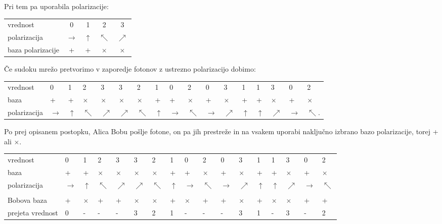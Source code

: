 \documentclass[A4paper, 11pt]{article}
\begin{document}
Pri tem pa uporabila polarizacije:

\begin{center}
\begin{tabular}{l c c c c}
vrednost & 0 & 1 & 2 & 3\\
polarizacija & $\rightarrow$ & $\uparrow$ & $\nwarrow$ & $\nearrow$\\
baza polarizacije & + & + & $\times$ & $\times$\\
\end{tabular}
\end{center}

Če sudoku mrežo pretvorimo v zaporedje fotonov z ustrezno polarizacijo dobimo:

\begin{center}
\begin{tabular}{l m{0.2 cm} m{0.2 cm} m{0.2 cm} m{0.2 cm} m{0.2 cm} m{0.2 cm} m{0.2 cm} m{0.2 cm} m{0.2 cm} m{0.2 cm} m{0.2 cm} m{0.2 cm} m{0.2 cm} m{0.2 cm} m{0.2 cm} m{0.2 cm}}
vrednost & 0 & 1 & 2 & 3 & 3 & 2 & 1 & 0 & 2 & 0 & 3 & 1 & 1 & 3 & 0 & 2\\
baza & + & + & $\times$ & $\times$ & $\times$ & $\times$ & + & + & $\times$ & + & $\times$ & + & + & $\times$ & + & $\times$\\
polarizacija & $\rightarrow$ & $\uparrow$ & $\nwarrow$ & $\nearrow$ & $\nearrow$ & $\nwarrow$ & $\uparrow$ & $\rightarrow$ & $\nwarrow$ & $\rightarrow$ & $\nearrow$ & $\uparrow$ & $\uparrow$ & $\nearrow$ & $\rightarrow$ & $\nwarrow$.
\end{tabular}
\end{center}

Po prej opisanem postopku, Alica Bobu pošlje fotone, on pa jih prestreže in na vsakem uporabi naključno izbrano bazo polarizacije, torej + ali $\times$. 

\begin{center}
\begin{tabular}{l m{0.2 cm} m{0.2 cm} m{0.2 cm} m{0.2 cm} m{0.2 cm} m{0.2 cm} m{0.2 cm} m{0.2 cm} m{0.2 cm} m{0.2 cm} m{0.2 cm} m{0.2 cm} m{0.2 cm} m{0.2 cm} m{0.2 cm} m{0.2 cm}}
vrednost & 0 & 1 & 2 & 3 & 3 & 2 & 1 & 0 & 2 & 0 & 3 & 1 & 1 & 3 & 0 & 2\\
baza & + & + & $\times$ & $\times$ & $\times$ & $\times$ & + & + & $\times$ & + & $\times$ & + & + & $\times$ & + & $\times$\\
polarizacija & $\rightarrow$ & $\uparrow$ & $\nwarrow$ & $\nearrow$ & $\nearrow$ & $\nwarrow$ & $\uparrow$ & $\rightarrow$ & $\nwarrow$ & $\rightarrow$ & $\nearrow$ & $\uparrow$ & $\uparrow$ & $\nearrow$ & $\rightarrow$ & $\nwarrow$\\
\\
Bobova baza & + & $\times$ & + & + & $\times$ & $\times$ & + & $\times$ & + & + & $\times$ & + & $\times$ & $\times$ & + & +\\
prejeta vrednost & 0 & - & - & - & 3 & 2 & 1 & - & - & - & 3 & 1 & - & 3 & - & 2\\ 
\end{tabular}
\end{center}
\end{document}
